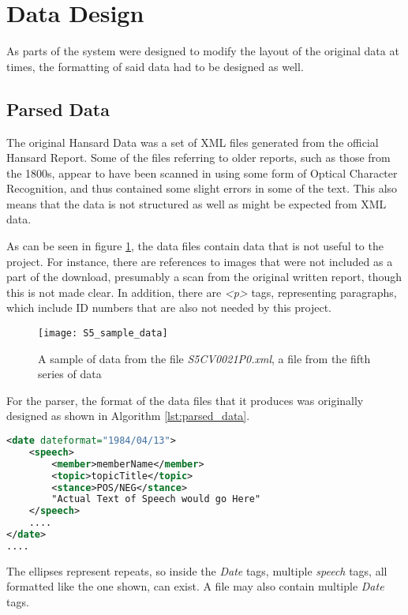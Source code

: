 \section{Data Design}
\label{sec:des_data}
As parts of the system were designed to modify the layout of the original data at times, the formatting of said data had to be designed as well.

\subsection{Parsed Data}
\label{sec:des_parsed_data}
The original Hansard Data was a set of XML files generated from the official Hansard Report. Some of the files referring to older reports, such as those from the 1800s, appear to have been scanned in using some form of Optical Character Recognition, and thus contained some slight errors in some of the text. This also means that the data is not structured as well as might be expected from XML data.

As can be seen in figure \ref{fig:S5_sample_screenshot}, the data files contain data that is not useful to the project. For instance, there are references to images that were not included as a part of the download, presumably a scan from the original written report, though this is not made clear. In addition, there are \emph{<p>} tags, representing paragraphs, which include ID numbers that are also not needed by this project.

\begin{figure}[ht]
	\texttt{[image: S5\_sample\_data]}
	\caption{A sample of data from the file \emph{S5CV0021P0.xml}, a file from the fifth series of data}
	\label{fig:S5_sample_screenshot}
\end{figure}
For the parser, the format of the data files that it produces was originally designed as shown in Algorithm \ref{lst:parsed_data}.
\begin{lstlisting}[language=XML,
				   float=ht,
				   caption={Earlier version of the Parsed Data design},
				   label={lst:parsed_data}]
<date dateformat="1984/04/13">	
    <speech>
        <member>memberName</member>
        <topic>topicTitle</topic>
        <stance>POS/NEG</stance>
        "Actual Text of Speech would go Here"
    </speech>
    ....
</date>
....
\end{lstlisting}
The ellipses represent repeats, so inside the \emph{Date} tags, multiple \emph{speech} tags, all formatted like the one shown, can exist. A file may also contain multiple \emph{Date} tags. 

